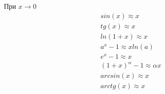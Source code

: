 \documentclass[a4paper,12pt]{article}
\begin{document}
\vspace{2ex}
При $x \to 0$
\begin{equation}
    \begin{aligned}
        &sin(x) \approx x \\
        &tg(x) \approx x \\
        &ln(1+x) \approx x \\
        &a^x - 1 \approx xln(a) \\
        &e^x - 1 \approx x \\
        &(1 + x)^\alpha - 1 \approx \alpha x \\
        &arcsin(x) \approx x \\
        &arctg(x) \approx x \\
    \end{aligned}
\end{equation}
\end{document}
